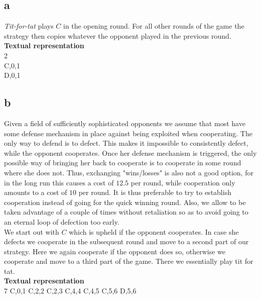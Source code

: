\documentclass[10pt,a4paper]{article}
\begin{document}
\subsection*{a}
\textit{Tit-for-tat} plays $C$ in the opening round. For all other rounds of the game the strategy then copies whatever the opponent played in the previous round.\\
\textbf{Textual representation}\\
2\\
C,0,1\\
D,0,1
\subsection*{b}
Given a field of sufficiently sophisticated opponents we assume that most have some defense mechanism in place against being exploited when cooperating. The only way to defend is to defect. This makes it impossible to consistently defect, while the opponent cooperates. Once her defense mechanism is triggered, the only possible way of bringing her back to cooperate is to cooperate in some round where she does not. Thus, exchanging "wins/losses" is also not a good option, for in the long run this causes a cost of $12.5$ per round, while cooperation only amounts to a cost of $10$ per round. It is thus preferable to try to establish cooperation instead of going for the quick winning round. Also, we allow to be taken advantage of a couple of times without retaliation so as to avoid going to an eternal loop of defection too early. \\
We start out with $C$ which is upheld if the opponent cooperates. In case she defects we cooperate in the subsequent round and move to a second part of our strategy. Here we again cooperate if the opponent does so, otherwise we cooperate and move to a third part of the game. There we essentially play tit for tat.\\
\textbf{Textual representation}\\
7
C,0,1
C,2,2
C,2,3
C,4,4
C,4,5
C,5,6
D,5,6
\end{document}
